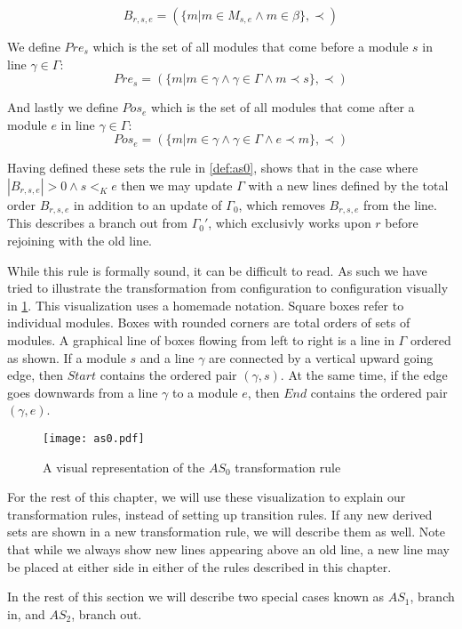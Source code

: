 \[B_{r,s,e} = (\{m |m \in M_{s,e} \land m \in \beta\}, \prec)\]

We define $Pre_{s}$ which is the set of all modules that come before a module $s$ in line $\gamma \in \Gamma$:
\[Pre_{s} = (\{m | m \in \gamma \land \gamma \in \Gamma \land m \prec s\}, \prec)\]

And lastly we define $Pos_{e}$ which is the set of all modules that come after a module $e$  in line $\gamma \in \Gamma$:
\[Pos_{e} = (\{m | m \in \gamma \land \gamma \in \Gamma \land e \prec  m \}, \prec)\]

Having defined these sets the rule in \cref{def:as0}, shows that in the case where $|B_{r,s,e}| > 0 \land s <_K e$ then we may update $\Gamma$ with a new lines defined by the total order $B_{r,s,e}$ in addition to an update of $\Gamma_0$, which removes $B_{r,s,e}$ from the line. This describes a branch out from $\Gamma_0'$, which exclusivly works upon $r$ before rejoining with the old line.   

While this rule is formally sound, it can be difficult to read. As such we have tried to illustrate the transformation from configuration to configuration visually in \cref{fig:as0}. This visualization uses a homemade notation. Square boxes refer to individual modules. Boxes with rounded corners are total orders of sets of modules. A graphical line of boxes flowing from left to right is a line in $\Gamma$ ordered as shown. If a module $s$ and a line $\gamma$ are connected by a vertical upward going edge, then $Start$ contains the ordered pair $(\gamma ,s)$. At the same time, if the edge goes downwards from a line $\gamma$ to a module $e$, then $End$ contains the ordered pair $(\gamma ,e)$.


\begin{figure}[H]
\centering
\texttt{[image: as0.pdf]}
\caption{A visual representation of the $AS_0$ transformation rule}
\label{fig:as0}
\end{figure}

For the rest of this chapter, we will use these visualization to explain our transformation rules, instead of setting up transition rules. If any new derived sets are shown in a new transformation rule, we will describe them as well. Note that while we always show new lines appearing above an old line, a new line may be placed at either side in either of the rules described in this chapter.  

In the rest of this section we will describe two special cases known as $AS_1$, branch in, and $AS_2$, branch out. 

